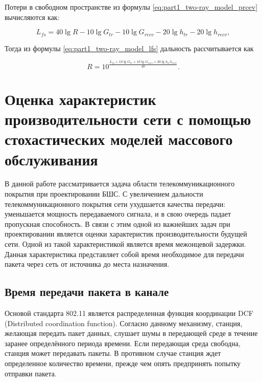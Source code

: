 Потери в свободном пространстве из формулы \cref{eq:part1_two-ray_model_prcev} вычисляются как:

\begin{equation}
  \label{eq:part1_two-ray_model_lfs}
  L_{fs} = 40\lg{R} - 10\lg{G_{tr}} - 10\lg{G_{recv}} - 20\lg{h_{tr}} - 20\lg{h_{recv}},
\end{equation}

Тогда из формулы \cref{eq:part1_two-ray_model_lfs} дальность рассчитывается как

\begin{equation}
  \label{eq:part1_two-ray_model_r}
  R = 10^\frac{L_{fs} + 10\lg{G_{tr}} + 10\lg{G_{recv}} + 20\lg{h_{tr}h_{recv}}}{40}.
\end{equation}



\subsection{}

\section{Оценка характеристик производительности сети с помощью стохастических моделей массового обслуживания}

В данной работе рассматривается задача области телекоммуникационного покрытия при проектировании БШС.  С увеличением дальности телекоммуникационного покрытия сети ухудшается качества передачи: уменьшается мощность передаваемого сигнала, и в свою очередь падает пропускная способность. В связи с этим одной из важнейших задач при проектировании является оценки характеристик производительности будущей сети. Одной из такой характеристикой является время межонцевой задержки. Данная характеристика представляет собой время необходимое для передачи пакета через сеть от источника до места назначения.
 

\subsection{Время передачи пакета в канале}


 Основой стандарта 802.11 является распределенная функция координации DCF (Distributed coordination function). Согласно данному механизму, станция, желающая передать пакет данных, слушает шумы в передающей среде в течение заранее определённого периода времени. Если передающая среда свободна, станция может передавать пакеты. В противном случае станция ждет определенное количество времени, прежде чем опять предпринять попытку отправки пакета.

